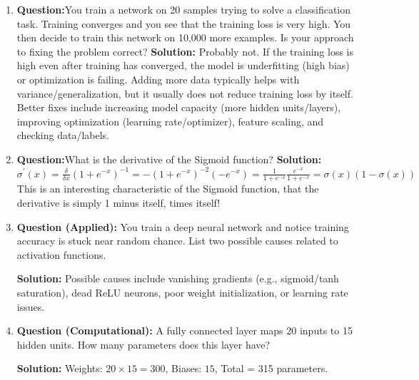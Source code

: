\documentclass{article}
\begin{document}
\begin{enumerate}
    \textbf{Solution:}
    Assuming the network is fully connected between consecutive layers and each non-input neuron has a bias:
    \[
    \#\text{weights} = 3\cdot 4 + 4\cdot 4 + 4\cdot 2 = 36,\qquad
    \#\text{biases} = 4+4+2 = 10.
    \]
    Thus the total number of tunable parameters is \(36+10=46\).
    \newline
    \item \textbf{Question:}\newline You train a network on 20 samples trying to solve a classification task. Training converges and you see that the training loss is very high. You then decide to train this network on 10,000 more examples. Is your approach to fixing the problem correct?
    \newline \newline
    \textbf{Solution:}\newline
    Probably not. If the training loss is high even after training has converged, the model is underfitting (high bias) or optimization is failing.
    Adding more data typically helps with variance/generalization, but it usually does not reduce training loss by itself.
    Better fixes include increasing model capacity (more hidden units/layers), improving optimization (learning rate/optimizer), feature scaling, and checking data/labels.
    \newline
    \item \textbf{Question:}\newline What is the derivative of the Sigmoid function?
    \newline \newline
    \textbf{Solution:}\newline \begin{math}
        \sigma^{'}(x) = \frac{\delta}{\delta x} (1+ e^{-x})^{-1} = -(1+e^{-x})^{-2} (-e^{-x}) = \frac{1}{1+e^{-x}} \frac{e^{-x}}{1+e^{-x}} = \sigma(x) (1 - \sigma(x))
    \end{math}
    \newline
    \newline This is an interesting characteristic of the Sigmoid function, that the derivative is simply 1 minus itself, times itself!


    \item \textbf{Question (Applied):}
You train a deep neural network and notice training accuracy is stuck near random chance. 
List two possible causes related to activation functions.

\textbf{Solution:}
Possible causes include vanishing gradients (e.g., sigmoid/tanh saturation), 
dead ReLU neurons, poor weight initialization, or learning rate issues.


\item \textbf{Question (Computational):}
A fully connected layer maps 20 inputs to 15 hidden units. How many parameters does this layer have?

\textbf{Solution:}
Weights: $20 \times 15 = 300$, Biases: $15$, Total = 315 parameters.

    
\end{enumerate}
\end{document}
